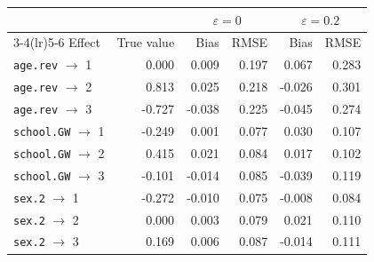 \begin{tabular}{lrrrrr}
\toprule
& & \multicolumn{2}{c}{$\varepsilon=0$} & \multicolumn{2}{c}{$\varepsilon=0.2$} \\
\cmidrule(lr){3-4}\cmidrule(lr){5-6}
Effect & True value & Bias & RMSE & Bias & RMSE \\
\midrule
\texttt{age.rev} $\to$ 1 & 0.000 & 0.009 & 0.197 & 0.067 & 0.283 \\
\texttt{age.rev} $\to$ 2 & 0.813 & 0.025 & 0.218 & -0.026 & 0.301 \\
\texttt{age.rev} $\to$ 3 & -0.727 & -0.038 & 0.225 & -0.045 & 0.274 \\
\texttt{school.GW} $\to$ 1 & -0.249 & 0.001 & 0.077 & 0.030 & 0.107 \\
\texttt{school.GW} $\to$ 2 & 0.415 & 0.021 & 0.084 & 0.017 & 0.102 \\
\texttt{school.GW} $\to$ 3 & -0.101 & -0.014 & 0.085 & -0.039 & 0.119 \\
\texttt{sex.2} $\to$ 1 & -0.272 & -0.010 & 0.075 & -0.008 & 0.084 \\
\texttt{sex.2} $\to$ 2 & 0.000 & 0.003 & 0.079 & 0.021 & 0.110 \\
\texttt{sex.2} $\to$ 3 & 0.169 & 0.006 & 0.087 & -0.014 & 0.111 \\
\bottomrule
\end{tabular}
